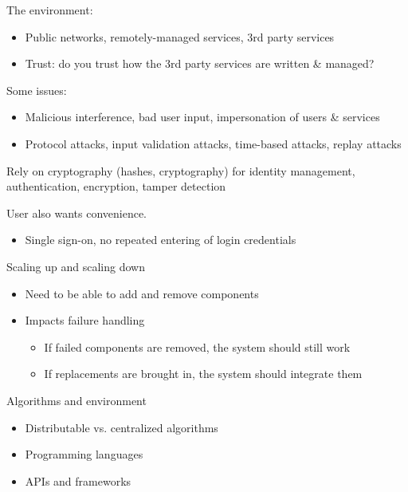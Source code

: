 \begin{slide}
	
	
	The environment:
	\begin{itemize}
		\item Public networks, remotely-managed services, 3rd party services
		\item Trust: do you trust how the 3rd party services are written \& managed?
	\end{itemize}
	\bigskip
	
	Some issues:
	\begin{itemize}
		\item Malicious interference, bad user input, impersonation of users \& services
		\item Protocol attacks, input validation attacks, time-based attacks, replay attacks
	\end{itemize}
	\bigskip
	
	Rely on cryptography (hashes, cryptography) for identity management, authentication, encryption, tamper detection
	\bigskip
	
	User also wants convenience.
	\begin{itemize}
		\item Single sign-on, no repeated entering of login credentials
	\end{itemize}
	
\end{slide}

\begin{slide}

	
	Scaling up and scaling down
	\begin{itemize}
		\item Need to be able to add and remove components
		\item Impacts failure handling
		\begin{itemize}
			\item If failed components are removed, the system should still work
			\item If replacements are brought in, the system should integrate them
		\end{itemize}
	\end{itemize}
	\bigskip
	
	Algorithms and environment
	\begin{itemize}
		\item Distributable vs. centralized algorithms
		\item Programming languages
		\item APIs and frameworks
	\end{itemize}

\end{slide}

